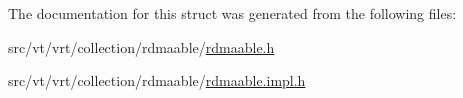 The documentation for this struct was generated from the following files\+:\begin{DoxyCompactItemize}
\item 
src/vt/vrt/collection/rdmaable/\hyperlink{rdmaable_8h}{rdmaable.\+h}\item 
src/vt/vrt/collection/rdmaable/\hyperlink{rdmaable_8impl_8h}{rdmaable.\+impl.\+h}\end{DoxyCompactItemize}

